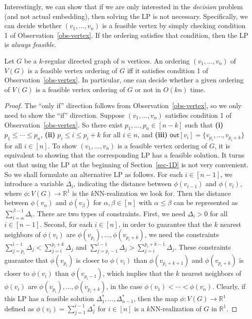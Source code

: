 Interestingly, we can show that if we are only interested in the \emph{decision} problem (and not actual embedding), then solving the LP is not necessary.
Specifically, we can decide whether $(v_1,\dots,v_n)$ is a feasible vertex by simply checking condition 1 of Observation~\ref{obs-vertex}.
If the ordering satisfies that condition, then the LP is \emph{always feasible}.

\begin{lemma} \label{lem-LP}
Let $G$ be a $k$-regular directed graph of $n$ vertices.
An ordering $(v_1,\dots,v_n)$ of $V(G)$ is a feasible vertex ordering of $G$ iff it satisfies condition 1 of Observation~\ref{obs-vertex}.
In particular, one can decide whether a given ordering of $V(G)$ is a feasible vertex ordering of $G$ or not in $O(kn)$ time.
\end{lemma}
\begin{proof}
The ``only if'' direction follows from Observation~\ref{obs-vertex}, so we only need to show the ``if'' direction.
Suppose $(v_1,\dots,v_n)$ satisfies condition 1 of Observation~\ref{obs-vertex}.
So there exist $p_1,\dots,p_n \in [n-k]$ such that \textnormal{\bf (i)} $p_1 \leq \cdots \leq p_n$, \textnormal{\bf (ii)} $p_i \leq i \leq p_i+k$ for all $i \in n$, and \textnormal{\bf (iii)} $\mathsf{out}[v_i] = \{v_{p_i},\dots,v_{p_i+k}\}$ for all $i \in [n]$.
To show $(v_1,\dots,v_n)$ is a feasible vertex ordering of $G$, it is equivalent to showing that the corresponding LP has a feasible solution.
It turns out that using the LP at the beginning of Section~\ref{sec-1D} is not very convenient.
So we shall formulate an alternative LP as follows.
For each $i \in [n-1]$, we introduce a variable $\Delta_i$, indicating the distance between $\phi(v_{i-1})$ and $\phi(v_i)$, where $\phi:V(G) \rightarrow \mathbb{R}^1$ is the $k$NN-realization we look for.
Then the distance between $\phi(v_\alpha)$ and $\phi(v_\beta)$ for $\alpha,\beta \in [n]$ with $\alpha \leq \beta$ can be represented as $\sum_{i=\alpha}^{\beta-1} \Delta_i$.
There are two types of constraints.
First, we need $\Delta_i > 0$ for all $i \in [n-1]$.
Second, for each $i \in [n]$, in order to guarantee that the $k$ nearest neighbors of $\phi(v_i)$ are $\phi(v_{p_i}),\dots,\phi(v_{p_i+k})$, we need the constraints $\sum_{j=p_i}^{i-1} \Delta_j < \sum_{j=i}^{p_i+k} \Delta_j$ and $\sum_{j=p_i-1}^{i-1} \Delta_j > \sum_{j=i}^{p_i+k-1} \Delta_j$.
These constraints guarantee that $\phi(v_{p_i})$ is closer to $\phi(v_i)$ than $\phi(v_{p_i+k+1})$ and $\phi(v_{p_i+k})$ is closer to $\phi(v_i)$ than $\phi(v_{p_i-1})$, which implies that the $k$ nearest neighbors of $\phi(v_i)$ are $\phi(v_{p_i}),\dots,\phi(v_{p_i+k})$, in the case $\phi(v_1) < \cdots < \phi(v_n)$.
Clearly, if this LP has a feasible solution $\Delta_1^*,\dots,\Delta_{n-1}^*$, then the map $\phi:V(G) \rightarrow \mathbb{R}^1$ defined as $\phi(v_i) = \sum_{j=1}^{i-1} \Delta_j^*$ for $i \in [n]$ is a $k$NN-realization of $G$ in $\mathbb{R}^1$.


\end{proof}
